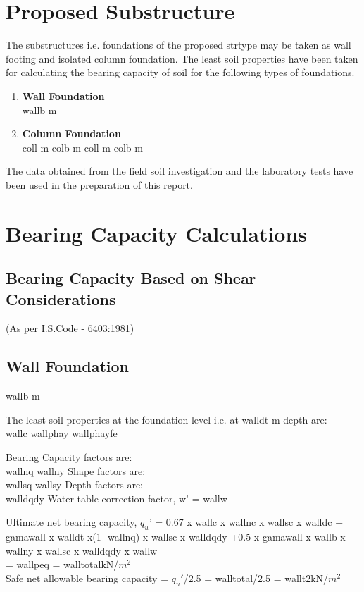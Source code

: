 \documentclass{soil12}
\begin{document}
\section{Proposed Substructure}
The substructures i.e. foundations of the proposed {{strtype}} may be taken as wall footing and isolated
column foundation. The least soil properties have been taken for calculating the bearing capacity of
soil for the following types of foundations.
\begin{enumerate}
\item{\large{\textbf{Wall Foundation}}}\\
{
{{wallb}}
 m}
\item{\large{\textbf{Column Foundation}}}\\
{
{{coll}}
 m}
{
{{colb}}
 m}
{
{{coll}}
 m}
{
{{colb}}
 m}
\end{enumerate}
The data obtained from the field soil investigation and the laboratory tests have been used in the
preparation of this report.
\section{Bearing Capacity Calculations}
\subsection{Bearing Capacity Based on Shear Considerations}
(As per I.S.Code - 6403:1981)
\subsection{Wall Foundation}
{
{{wallb}}
 m}

The least soil properties at the foundation level i.e. at {{walldt}} m depth are:\\
{
{{wallc}}
}
{
{{wallphay}}
}
{
{{wallphayfe}}
}

Bearing Capacity factors are:\\
{ 
{{wallnq}}
}
{
{{wallny}}
}
Shape factors are:\\
{
{{wallsq}}
}
{
{{wallsy}}
}
Depth factors are:\\    
{
{{walldqdy}}
}
Water table correction factor, w' = {{wallw}}

Ultimate net bearing capacity, $q_u$' = 0.67 x {{wallc}} x {{wallnc}} x {{wallsc}} x {{walldc}} + {{gamawall}} x {{walldt}} x(1 -{{wallnq}}) x {{wallsc}} x {{walldqdy}} +0.5 x {{gamawall}} x {{wallb}} x {{wallny}} x {{wallsc}} x {{walldqdy}} x {{wallw}}\\
= {{wallpeq}} = {{walltotal}}kN/$m^2$ \\	
Safe net allowable bearing capacity = $q_u'$/2.5 = {{walltotal}}/2.5 = {{wallt2}}kN/$m^2$
\end{document}
